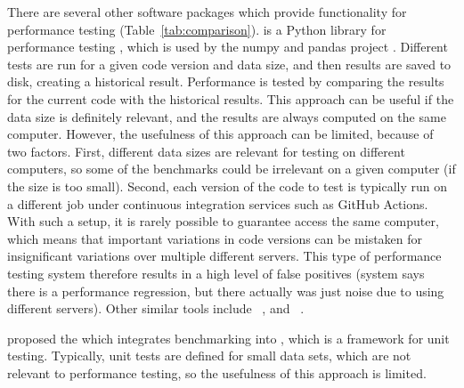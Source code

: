 There are several other software packages which provide functionality for performance testing (Table~\ref{tab:comparison}).
 is a Python library for performance testing \citep{airspeed_velocity}, which is used by the numpy and pandas project \citep{numpy,pandas}. 
Different tests are run for a given code version and data size, and then results are saved to disk, creating a historical result.
Performance is tested by comparing the results for the current code with the historical results.
This approach can be useful if the data size is definitely relevant, and the results are always computed on the same computer.
However, the usefulness of this approach can be limited, because of two factors. 
First, different data sizes are relevant for testing on different computers, so some of the benchmarks could be irrelevant on a given computer (if the size is too small). 
Second, each version of the code to test is typically run on a different job under continuous integration services such as GitHub Actions. 
With such a setup, it is rarely possible to guarantee access the same computer, which means that important variations in code versions can be mistaken for insignificant variations over multiple different servers.
This type of performance testing system therefore results in a high level of false positives (system says there is a performance regression, but there actually was just noise due to using different servers).
Other similar tools include
~\citep{conbench}, 
and ~\citep{bencher}.

\citet{pytest_benchmark} proposed the  which integrates  benchmarking into , which is a framework for unit testing.
Typically, unit tests are defined for small data sets, which are not relevant to performance testing, so the usefulness of this approach is limited.

